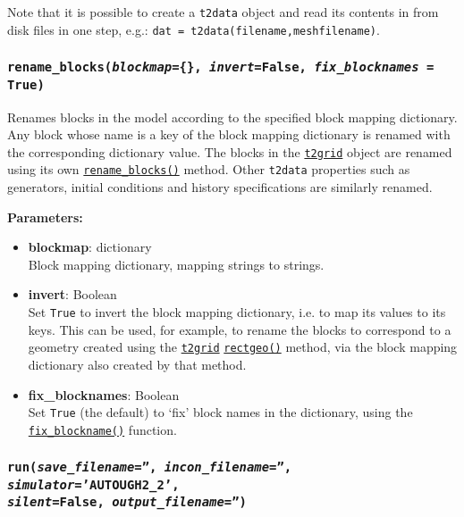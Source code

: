 Note that it is possible to create a \texttt{t2data} object and read its contents in from disk files in one step, e.g.: \texttt{dat = t2data(filename,meshfilename)}.

\begin{snugshade}
\subsubsection{\texttt{rename\_blocks(\emph{blockmap}=\{\}, \emph{invert}=False, \emph{fix\_blocknames} = True)}}
\end{snugshade}
\label{sec:t2data:rename_blocks}

Renames blocks in the model according to the specified block mapping dictionary. Any block whose name is a key of the block mapping dictionary is renamed with the corresponding dictionary value. The blocks in the \hyperref[t2grids]{\texttt{t2grid}} object are renamed using its own \hyperref[sec:t2grid:rename_blocks]{\texttt{rename\_blocks()}} method. Other \texttt{t2data} properties such as generators, initial conditions and history specifications are similarly renamed.

\textbf{Parameters:}
\begin{itemize}
\item \textbf{blockmap}: dictionary\\
  Block mapping dictionary, mapping strings to strings.
\item \textbf{invert}: Boolean\\
  Set \texttt{True} to invert the block mapping dictionary, i.e. to map its values to its keys. This can be used, for example, to rename the blocks to correspond to a geometry created using the \hyperref[t2grids]{\texttt{t2grid}} \hyperref[sec:t2grid:rectgeo]{\texttt{rectgeo()}} method, via the block mapping dictionary also created by that method.
\item \textbf{fix\_blocknames}: Boolean\\
  Set \texttt{True} (the default) to `fix' block names in the dictionary, using the \hyperref[sec:mulgrid:fix_blockname]{\texttt{fix\_blockname()}} function. 
\end{itemize}

\begin{snugshade}
\subsubsection{\texttt{run(\emph{save\_filename}='', \emph{incon\_filename}='', \emph{simulator}='AUTOUGH2\_2',\\
    \emph{silent}=False, \emph{output\_filename}='')}}
\end{snugshade}
\label{sec:t2data:run}

